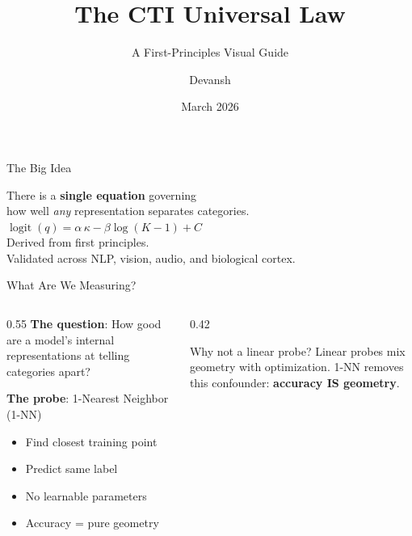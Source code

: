 \documentclass[aspectratio=169,14pt]{beamer}
\title{The CTI Universal Law}
\subtitle{A First-Principles Visual Guide}
\author{Devansh}
\date{March 2026}
\DeclareMathOperator{\logit}{logit}
\begin{document}
\begin{frame}
\titlepage
\end{frame}

\begin{frame}{The Big Idea}
\begin{center}
\Large
There is a \textbf{single equation} governing\\
how well \textit{any} representation separates categories.\\[0.8cm]

\Huge\color{ctiblue}
$\logit(q) = \alpha\,\kappa - \beta\log(K{-}1) + C$\\[0.8cm]

\normalsize\color{black}
Derived from first principles.\\
Validated across NLP, vision, audio, and biological cortex.
\end{center}
\end{frame}

\begin{frame}{What Are We Measuring?}
\begin{columns}[T]
\begin{column}{0.55\textwidth}
\textbf{The question}: How good are a model's internal representations at telling categories apart?

\vspace{0.3cm}
\textbf{The probe}: 1-Nearest Neighbor (1-NN)
\begin{itemize}
\item Find closest training point
\item Predict same label
\item No learnable parameters
\item Accuracy = pure geometry
\end{itemize}
\end{column}
\begin{column}{0.42\textwidth}
\begin{block}{Why not a linear probe?}
\small
Linear probes mix geometry with optimization. 1-NN removes this confounder: \textbf{accuracy IS geometry}.
\end{block}
\end{column}
\end{columns}
\end{frame}
\end{document}
